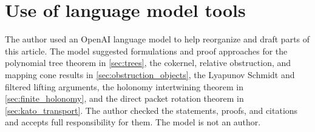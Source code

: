 \documentclass{aomart}
\theoremstyle{definition}
\theoremstyle{remark}
\begin{document}
\section*{Use of language model tools}

The author used an OpenAI language model to help reorganize and draft parts of this article.  The model suggested formulations and proof approaches for the polynomial tree theorem in \cref{sec:trees}, the cokernel, relative obstruction, and mapping cone results in \cref{sec:obstruction_objects}, the Lyapunov Schmidt and filtered lifting arguments, the holonomy intertwining theorem in \cref{sec:finite_holonomy}, and the direct packet rotation theorem in \cref{sec:kato_transport}.  The author checked the statements, proofs, and citations and accepts full responsibility for them.  The model is not an author.



\end{document}
